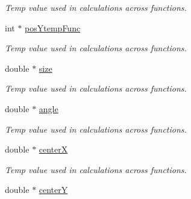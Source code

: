 \begin{DoxyCompactItemize}
\begin{DoxyCompactList}\small\item\em Temp value used in calculations across functions. \end{DoxyCompactList}\item 
\hypertarget{classgamescene__1__ladderSnake_ac490aecde4bcea372216a7aa09fac13f}{int $\ast$ \hyperlink{classgamescene__1__ladderSnake_ac490aecde4bcea372216a7aa09fac13f}{pos\-Ytemp\-Func}}\label{classgamescene__1__ladderSnake_ac490aecde4bcea372216a7aa09fac13f}

\begin{DoxyCompactList}\small\item\em Temp value used in calculations across functions. \end{DoxyCompactList}\item 
\hypertarget{classgamescene__1__ladderSnake_acd9d50c3aa4c03f9db9ae1cee3b3283d}{double $\ast$ \hyperlink{classgamescene__1__ladderSnake_acd9d50c3aa4c03f9db9ae1cee3b3283d}{size}}\label{classgamescene__1__ladderSnake_acd9d50c3aa4c03f9db9ae1cee3b3283d}

\begin{DoxyCompactList}\small\item\em Temp value used in calculations across functions. \end{DoxyCompactList}\item 
\hypertarget{classgamescene__1__ladderSnake_acef81d50d4cd4e0168c26b5b0347c964}{double $\ast$ \hyperlink{classgamescene__1__ladderSnake_acef81d50d4cd4e0168c26b5b0347c964}{angle}}\label{classgamescene__1__ladderSnake_acef81d50d4cd4e0168c26b5b0347c964}

\begin{DoxyCompactList}\small\item\em Temp value used in calculations across functions. \end{DoxyCompactList}\item 
\hypertarget{classgamescene__1__ladderSnake_a8f56ae5b63fa153006ba2f0233a73b9d}{double $\ast$ \hyperlink{classgamescene__1__ladderSnake_a8f56ae5b63fa153006ba2f0233a73b9d}{center\-X}}\label{classgamescene__1__ladderSnake_a8f56ae5b63fa153006ba2f0233a73b9d}

\begin{DoxyCompactList}\small\item\em Temp value used in calculations across functions. \end{DoxyCompactList}\item 
\hypertarget{classgamescene__1__ladderSnake_a74d54191e673db2dde4396c2a50c6989}{double $\ast$ \hyperlink{classgamescene__1__ladderSnake_a74d54191e673db2dde4396c2a50c6989}{center\-Y}}\label{classgamescene__1__ladderSnake_a74d54191e673db2dde4396c2a50c6989}


\end{DoxyCompactItemize}
